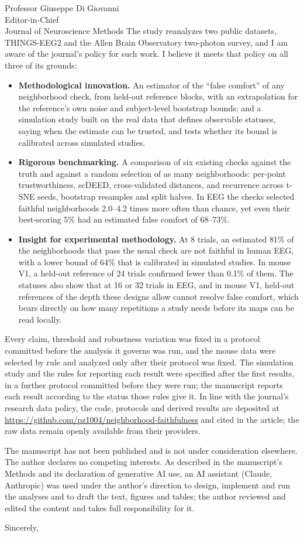 \documentclass[11pt]{letter}
\newcommand{\EegLeight}{64}
\newcommand{\EegFCeightSmaller}{81}
\newcommand{\BmEnrichLo}{2.0}
\newcommand{\BmEnrichHi}{4.2}
\newcommand{\BmFiveLo}{68}
\newcommand{\BmFiveHi}{73}
\begin{document}
\begin{letter}{Professor Giuseppe Di Giovanni\\ Editor-in-Chief\\ Journal of Neuroscience Methods}
The study reanalyzes two public datasets, THINGS-EEG2 and the Allen Brain Observatory two-photon
survey, and I am aware of the journal's policy for such work. I believe it meets that policy on
all three of its grounds:
\begin{itemize}[leftmargin=*]
  \item \textbf{Methodological innovation.} An estimator of the ``false comfort'' of any
  neighborhood check, from held-out reference blocks, with an extrapolation for the reference's
  own noise and subject-level bootstrap bounds; and a simulation study built on the real data that
  defines observable statuses, saying when the estimate can be trusted, and tests whether its
  bound is calibrated across simulated studies.
  \item \textbf{Rigorous benchmarking.} A comparison of six existing checks against the truth and
  against a random selection of as many neighborhoods: per-point trustworthiness, scDEED,
  cross-validated distances, and recurrence across t-SNE seeds, bootstrap resamples and split
  halves. In EEG the checks selected faithful neighborhoods \BmEnrichLo--\BmEnrichHi{} times more
  often than chance, yet even their best-scoring 5\% had an estimated false comfort of
  \BmFiveLo--\BmFiveHi\%.
  \item \textbf{Insight for experimental methodology.} At 8 trials, an estimated
  \EegFCeightSmaller\% of the neighborhoods that pass the usual check are not faithful in human
  EEG, with a lower bound of \EegLeight\% that is calibrated in simulated studies. In mouse V1, a
  held-out reference of 24 trials confirmed fewer than 0.1\% of them. The statuses also show that
  at 16 or 32 trials in EEG, and in mouse V1, held-out references of the depth these designs allow
  cannot resolve false comfort, which bears directly on how many repetitions a study needs before
  its maps can be read locally.
\end{itemize}
Every claim, threshold and robustness variation was fixed in a protocol committed before the
analysis it governs was run, and the mouse data were selected by rule and analyzed only after
their protocol was fixed. The simulation study and the rules for reporting each result were
specified after the first results, in a further protocol committed before they were run; the
manuscript reports each result according to the status those rules give it. In line with the
journal's research data policy, the code, protocols and derived results are deposited at
\url{https://github.com/pz1004/neighborhood-faithfulness} and cited in the article; the raw
data remain openly available from their providers.

The manuscript has not been published and is not under consideration elsewhere. The author
declares no competing interests. As described in the manuscript's Methods and its declaration
of generative AI use, an AI assistant (Claude, Anthropic) was used under the author's
direction to design, implement and run the analyses and to draft the text, figures and tables; the
author reviewed and edited the content and takes full responsibility for it.

\closing{Sincerely,}
\end{letter}
\end{document}

